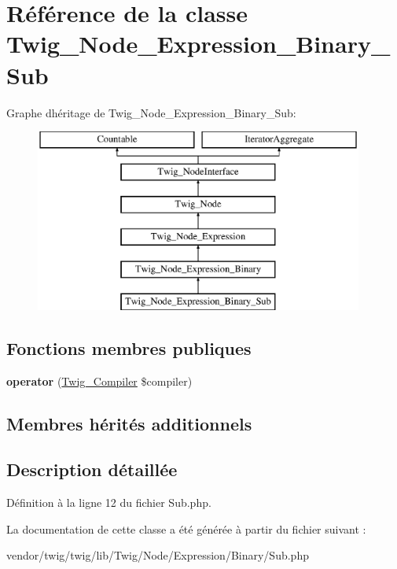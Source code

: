 \hypertarget{class_twig___node___expression___binary___sub}{}\section{Référence de la classe Twig\+\_\+\+Node\+\_\+\+Expression\+\_\+\+Binary\+\_\+\+Sub}
\label{class_twig___node___expression___binary___sub}
Graphe d\textquotesingle{}héritage de Twig\+\_\+\+Node\+\_\+\+Expression\+\_\+\+Binary\+\_\+\+Sub\+:\begin{figure}[H]
\begin{center}
\leavevmode
\includegraphics[height=6.000000cm]{class_twig___node___expression___binary___sub}
\end{center}
\end{figure}
\subsection*{Fonctions membres publiques}
\begin{DoxyCompactItemize}
\item 
{\bfseries operator} (\hyperlink{class_twig___compiler}{Twig\+\_\+\+Compiler} \$compiler)\hypertarget{class_twig___node___expression___binary___sub_af77318ec88d5f8a508684970a150b670}{}\label{class_twig___node___expression___binary___sub_af77318ec88d5f8a508684970a150b670}

\end{DoxyCompactItemize}
\subsection*{Membres hérités additionnels}


\subsection{Description détaillée}


Définition à la ligne 12 du fichier Sub.\+php.



La documentation de cette classe a été générée à partir du fichier suivant \+:\begin{DoxyCompactItemize}
\item 
vendor/twig/twig/lib/\+Twig/\+Node/\+Expression/\+Binary/Sub.\+php\end{DoxyCompactItemize}
